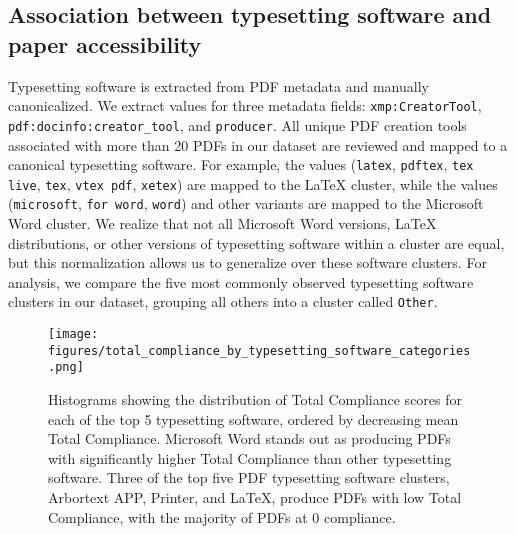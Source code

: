 \subsection{Association between typesetting software and paper accessibility}
\label{sec:sos_pdf_headers}

Typesetting software is extracted from PDF metadata and manually canonicalized. We extract values for three metadata fields: \texttt{xmp:CreatorTool}, \texttt{pdf:docinfo:creator\_tool}, and \texttt{producer}. All unique PDF creation tools associated with more than 20 PDFs in our dataset are reviewed and mapped to a canonical typesetting software. For example, the values (\texttt{latex}, \texttt{pdftex}, \texttt{tex live}, \texttt{tex}, \texttt{vtex pdf}, \texttt{xetex}) are mapped to the LaTeX cluster, while the values (\texttt{microsoft}, \texttt{for word}, \texttt{word}) and other variants are mapped to the Microsoft Word cluster. We realize that not all Microsoft Word versions, LaTeX distributions, or other versions of typesetting software within a cluster are equal, but this normalization allows us to generalize over these software clusters. For analysis, we compare the five most commonly observed typesetting software clusters in our dataset, grouping all others into a cluster called \texttt{Other}.

\begin{figure}[t!]
  \centering
    \texttt{[image: figures/total\_compliance\_by\_typesetting\_software\_categories.png]}
  \caption{Histograms showing the distribution of Total Compliance scores for each of the top 5 typesetting software, ordered by decreasing mean Total Compliance. Microsoft Word stands out as producing PDFs with significantly higher Total Compliance than other typesetting software. Three of the top five PDF typesetting software clusters, Arbortext APP, Printer, and LaTeX, produce PDFs with low Total Compliance, with the majority of PDFs at 0 compliance. 
  }
  \label{fig:fos-total-compliance-headers}
\end{figure}

